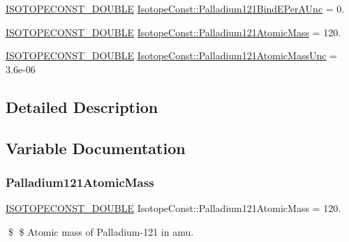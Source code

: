 \begin{DoxyCompactItemize}
\mbox{\hyperlink{group___isotope_const-_macros_ga8f45a7272ce02c0b4c65c44636ed719a}{I\+S\+O\+T\+O\+P\+E\+C\+O\+N\+S\+T\+\_\+\+D\+O\+U\+B\+LE}} \mbox{\hyperlink{group___isotope_const-_palladium-_pd121_ga76fcac418d406e8d0f3ae5316fdc433c}{Isotope\+Const\+::\+Palladium121\+Bind\+E\+Per\+A\+Unc}} = 0.
\item 
\mbox{\hyperlink{group___isotope_const-_macros_ga8f45a7272ce02c0b4c65c44636ed719a}{I\+S\+O\+T\+O\+P\+E\+C\+O\+N\+S\+T\+\_\+\+D\+O\+U\+B\+LE}} \mbox{\hyperlink{group___isotope_const-_palladium-_pd121_gab65a0db93329c6967cbfc3c750d7efcc}{Isotope\+Const\+::\+Palladium121\+Atomic\+Mass}} = 120.
\item 
\mbox{\hyperlink{group___isotope_const-_macros_ga8f45a7272ce02c0b4c65c44636ed719a}{I\+S\+O\+T\+O\+P\+E\+C\+O\+N\+S\+T\+\_\+\+D\+O\+U\+B\+LE}} \mbox{\hyperlink{group___isotope_const-_palladium-_pd121_gac9d6d62fceb33c7e331414a9c0081432}{Isotope\+Const\+::\+Palladium121\+Atomic\+Mass\+Unc}} = 3.\+6e-\/06
\end{DoxyCompactItemize}


\subsection{Detailed Description}


\subsection{Variable Documentation}
\mbox{\label{group___isotope_const-_palladium-_pd121_gab65a0db93329c6967cbfc3c750d7efcc}} 
\subsubsection{\texorpdfstring{Palladium121\+Atomic\+Mass}{Palladium121AtomicMass}}
{\footnotesize\ttfamily \mbox{\hyperlink{group___isotope_const-_macros_ga8f45a7272ce02c0b4c65c44636ed719a}{I\+S\+O\+T\+O\+P\+E\+C\+O\+N\+S\+T\+\_\+\+D\+O\+U\+B\+LE}} Isotope\+Const\+::\+Palladium121\+Atomic\+Mass = 120.}

\$ \$ Atomic mass of Palladium-\/121 in amu. \mbox{\label{group___isotope_const-_palladium-_pd121_gac9d6d62fceb33c7e331414a9c0081432}} 

